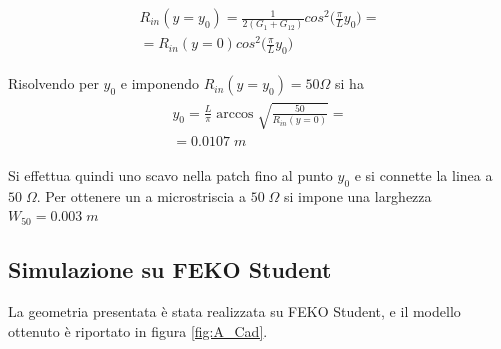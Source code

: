 \documentclass[twoside,twocolumn]{article}
\begin{document}
\begin{align} \label{eq:Rin}
\begin{split}
R_{in}(y=y_{0})=\frac{1}{2(G_{1}+G_{12})}cos^2\Big( \frac{\pi}{L}y_{0}\Big)=\\
=R_{in}(y=0)cos^2\Big(\frac{\pi}{L}y_{0}\Big)
\end{split}
\end{align}

Risolvendo per $y_{0}$ e imponendo \newline$R_{in}(y=y_{0})= 50 \Omega$ si ha 
\begin{align}
\begin{split}
 y_{0}= \frac {L}{\pi}\arccos\sqrt{\frac{50}{R_{in}(y=0)}}= \\=0.0107 \; m
 \end{split}
\end{align}

Si effettua quindi uno scavo nella patch fino al punto $y_{0}$ e si connette la linea a $50\; \Omega$.\newline
Per ottenere un a microstriscia a $50\; \Omega$ si impone una larghezza $W_{50}= 0.003 \; m$



\subsection*{Simulazione su FEKO Student}
La geometria presentata è stata realizzata su FEKO Student, e il modello ottenuto è riportato in figura \ref{fig:A_Cad}.
\end{document}
